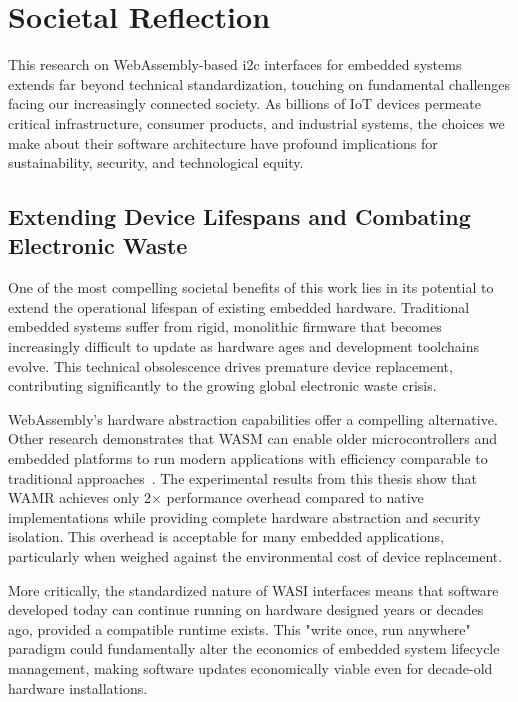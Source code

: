 \chapter*{Societal Reflection}
\label{chap:ethics}

This research on WebAssembly-based \acrshort{i2c} interfaces for embedded systems extends far beyond technical standardization, touching on fundamental challenges facing our increasingly connected society. As billions of IoT devices permeate critical infrastructure, consumer products, and industrial systems, the choices we make about their software architecture have profound implications for sustainability, security, and technological equity.

\section*{Extending Device Lifespans and Combating Electronic Waste}

One of the most compelling societal benefits of this work lies in its potential to extend the operational lifespan of existing embedded hardware. Traditional embedded systems suffer from rigid, monolithic firmware that becomes increasingly difficult to update as hardware ages and development toolchains evolve. This technical obsolescence drives premature device replacement, contributing significantly to the growing global electronic waste crisis.

WebAssembly's hardware abstraction capabilities offer a compelling alternative. Other research demonstrates that WASM can enable older microcontrollers and embedded platforms to run modern applications with efficiency comparable to traditional approaches~\cite{wagner_energy, xiong_energy}. The experimental results from this thesis show that WAMR achieves only 2× performance overhead compared to native implementations while providing complete hardware abstraction and security isolation. This overhead is acceptable for many embedded applications, particularly when weighed against the environmental cost of device replacement.

More critically, the standardized nature of WASI interfaces means that software developed today can continue running on hardware designed years or decades ago, provided a compatible runtime exists. This "write once, run anywhere" paradigm could fundamentally alter the economics of embedded system lifecycle management, making software updates economically viable even for decade-old hardware installations.

